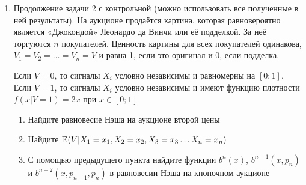 \begin{enumerate}



\item Продолжение задачи 2 с контрольной (можно использовать все полученные в ней результаты).
На аукционе продаётся картина, которая равновероятно является «Джокондой» Леонардо да Винчи или её подделкой. За неё торгуются $ n $ покупателей. Ценность картины для всех покупателей одинакова, $ V_{1}=V_{2}=\ldots =V_{n}=V $ и равна 1, если это оригинал и 0, если подделка.

Если $ V=0 $, то сигналы $ X_{i} $ условно независимы и равномерны на $ [0;1] $. Если $ V=1 $, то сигналы $ X_{i} $ условно независимы и имеют функцию плотности $ f(x|V=1)=2x $ при  $x\in [0;1] $

\begin{enumerate}
\item Найдите равновесие Нэша на аукционе второй цены
\item Найдите $ \mathbb{E}(V|X_{1}=x_{1},X_{2}=x_{2},X_{3}=x_{3}\ldots X_{n}=x_{n}) $
\item С помощью предыдущего пункта найдите функции $ b^{n}(x) $,  $ b^{n-1}(x,p_{n}) $  и $ b^{n-2}(x,p_{n-1},p_{n}) $ в равновесии Нэша на кнопочном аукционе
\end{enumerate}





\end{enumerate}
